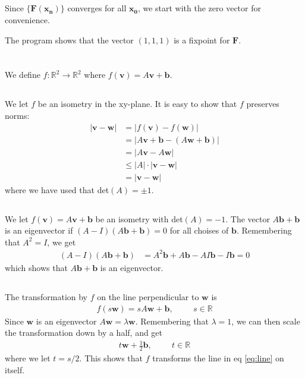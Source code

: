 \documentclass[a4paper,10pt,english]{article}
\begin{document}
\newpage

\subsection{} \label{2c}
Since $\{\bm{F(x_{\text{n}})}\}$ converges for all $\bm{x_0}$, we start with the zero vector for convenience.


The program shows that the vector $(1, 1, 1)$ is a fixpoint for $\bm{F}$.

\newpage

\section{} \label{3}
We define $f: \mathbb{R}^2 \to \mathbb{R}^2$ where $f(\bm{v}) = A \bm{v} + \bm{b}$.

\subsection{} \label{3a}
We let $f$ be an isometry in the xy-plane. It is easy to show that $f$ preserves norms:
\begin{align*}
    |\bm{v} - \bm{w}| &= |f(\bm{v}) - f(\bm{w})| \\
    &= |A\bm{v} + \bm{b} - (A\bm{w} + \bm{b})| \\
    &= |A\bm{v} - A\bm{w}| \\
    &\leq |A| \cdot |\bm{v} - \bm{w}| \\
    &= |\bm{v} - \bm{w}|
\end{align*}
where we have used that det$(A)=\pm 1$.

\subsection{} \label{3b}
We let $f(\bm{v}) = A \bm{v} + \bm{b}$ be an isometry with det$(A)=-1$. The vector $A \bm{b} + \bm{b}$ is an eigenvector if $(A-I)(A \bm{b} + \bm{b}) = 0$ for all choises of $\bm{b}$. Remembering that $A^2 = I$, we get
\begin{align*}
    (A-I)(A \bm{b} + \bm{b}) &= A^2 \bm{b} + A \bm{b} - AI \bm{b} - I \bm{b} = 0
\end{align*}
which shows that $A \bm{b} + \bm{b}$ is an eigenvector.

\subsection{} \label{3c}
The transformation by $f$ on the line perpendicular to $\bm{w}$ is
\begin{align*}
    f(s\bm{w}) = s A \bm{w} + \bm{b}, \hspace{1cm} s \in \mathbb{R}
\end{align*}
Since $\bm{w}$ is an eigenvector $A \bm{w} = \lambda \bm{w}$. Remembering that $\lambda = 1$, we can then scale the transformation down by a half, and get
\begin{align} \label{eq:line}
    t \bm{w} + \frac{1}{2} \bm{b}, \hspace{1cm} t \in \mathbb{R}
\end{align}
where we let $t = s/2$. This shows that $f$ transforms the line in eq \ref{eq:line} on itself.
\end{document}
